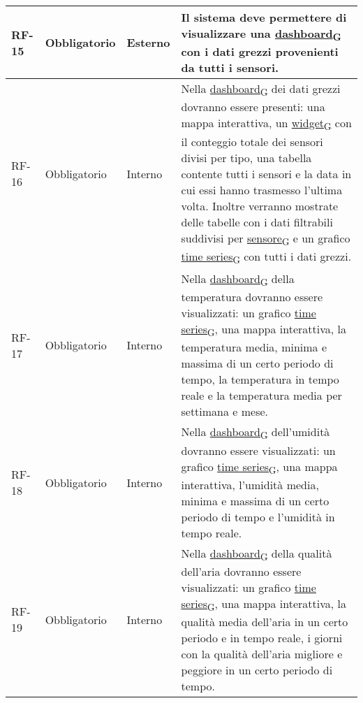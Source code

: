 \begin{longtable}{|>{\centering\arraybackslash}m{}|>{\centering\arraybackslash}m{}|>{\centering\arraybackslash}m{}|>{\centering\arraybackslash}m{}|}
	\\\hline
	RF-15           & Obbligatorio        & Esterno        & Il sistema deve permettere di visualizzare una \href{https://7last.github.io/docs/rtb/documentazione-interna/glossario\#dashboard}{dashboard\textsubscript{G}} con i dati grezzi provenienti da tutti i sensori.
	\\\hline
	RF-16           & Obbligatorio        & Interno        & Nella \href{https://7last.github.io/docs/rtb/documentazione-interna/glossario\#dashboard}{dashboard\textsubscript{G}} dei dati grezzi dovranno essere presenti: una mappa interattiva, un \href{https://7last.github.io/docs/rtb/documentazione-interna/glossario\#widget}{widget\textsubscript{G}} con il conteggio totale dei sensori divisi per tipo, una tabella contente tutti i sensori e la data in cui essi hanno trasmesso l'ultima volta. Inoltre verranno mostrate delle tabelle con i dati filtrabili suddivisi per \href{https://7last.github.io/docs/rtb/documentazione-interna/glossario\#sensore}{sensore\textsubscript{G}} e un grafico \href{https://7last.github.io/docs/rtb/documentazione-interna/glossario\#time-series}{time series\textsubscript{G}} con tutti i dati grezzi. 
	\\\hline
	RF-17           & Obbligatorio        & Interno        & Nella \href{https://7last.github.io/docs/rtb/documentazione-interna/glossario\#dashboard}{dashboard\textsubscript{G}} della temperatura dovranno essere visualizzati: un grafico \href{https://7last.github.io/docs/rtb/documentazione-interna/glossario\#time-series}{time series\textsubscript{G}}, una mappa interattiva, la temperatura media, minima e massima di un certo periodo di tempo, la temperatura in tempo reale e la temperatura media per settimana e mese.
	\\\hline
	RF-18           & Obbligatorio        & Interno        & Nella \href{https://7last.github.io/docs/rtb/documentazione-interna/glossario\#dashboard}{dashboard\textsubscript{G}} dell'umidità dovranno essere visualizzati: un grafico \href{https://7last.github.io/docs/rtb/documentazione-interna/glossario\#time-series}{time series\textsubscript{G}}, una mappa interattiva, l'umidità media, minima e massima di un certo periodo di tempo e l'umidità in tempo reale.
	\\\hline
	RF-19           & Obbligatorio        & Interno        & Nella \href{https://7last.github.io/docs/rtb/documentazione-interna/glossario\#dashboard}{dashboard\textsubscript{G}} della qualità dell'aria dovranno essere visualizzati: un grafico \href{https://7last.github.io/docs/rtb/documentazione-interna/glossario\#time-series}{time series\textsubscript{G}}, una mappa interattiva, la qualità media dell'aria in un certo periodo e in tempo reale, i giorni con la qualità dell'aria migliore e peggiore in un certo periodo di tempo.

\end{longtable}
